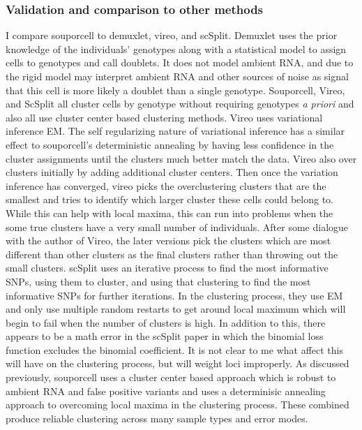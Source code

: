 \subsubsection{Validation and comparison to other methods}

\par{
I compare souporcell to demuxlet, vireo, and scSplit. Demuxlet uses the prior knowledge of the individuals' genotypes along with a statistical model to assign cells to genotypes and call doublets. It does not model ambient RNA, and due to the rigid model may interpret ambient RNA and other sources of noise as signal that this cell is more likely a doublet than a single genotype. Souporcell, Vireo, and ScSplit all cluster cells by genotype without requiring genotypes \textit{a priori} and also all use cluster center based clustering methods. Vireo uses variational inference EM. The self regularizing nature of variational inference has a similar effect to souporcell's deterministic annealing by having less confidence in the cluster assignments until the clusters much better match the data. Vireo also over clusters initially by adding additional cluster centers. Then once the variation inference has converged, vireo picks the overclustering clusters that are the smallest and tries to identify which larger cluster these cells could belong to. While this can help with local maxima, this can run into problems when the some true clusters have a very small number of individuals. After some dialogue with the author of Vireo, the later versions pick the clusters which are most different than other clusters as the final clusters rather than throwing out the small clusters. scSplit uses an iterative process to find the most informative SNPs, using them to cluster, and using that clustering to find the most informative SNPs for further iterations. In the clustering process, they use EM and only use multiple random restarts to get around local maximum which will begin to fail when the number of clusters is high. In addition to this, there appears to be a math error in the scSplit paper in which the binomial loss function excludes the binomial coefficient. It is not clear to me what affect this will have on the clustering process, but will weight loci improperly. As discussed previously, souporcell uses a cluster center based approach which is robust to ambient RNA and false positive variants and uses a determinisic annealing approach to overcoming local maxima in the clustering process. These combined produce reliable clustering across many sample types and error modes.
}

